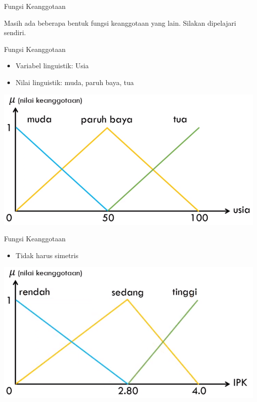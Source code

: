 \documentclass[pdflatex,compress,mathserif]{beamer}
\begin{document}
\begin{frame}{Fungsi Keanggotaan}
	\begin{center}
		Masih ada beberapa bentuk fungsi keanggotaan yang lain. Silakan dipelajari sendiri.
	\end{center}
\end{frame}

\begin{frame}{Fungsi Keanggotaan}
	\begin{itemize}
		\item Variabel linguistik: Usia
		\item Nilai linguistik: muda, paruh baya, tua
	\end{itemize}
	\begin{center}
		\includegraphics[width=0.7\linewidth]{img/18}
	\end{center}
\end{frame}

\begin{frame}{Fungsi Keanggotaan}
	\begin{itemize}
		\item Tidak harus simetris
	\end{itemize}
	\begin{center}
		\includegraphics[width=0.7\linewidth]{img/19}
	\end{center}
\end{frame}
\end{document}
